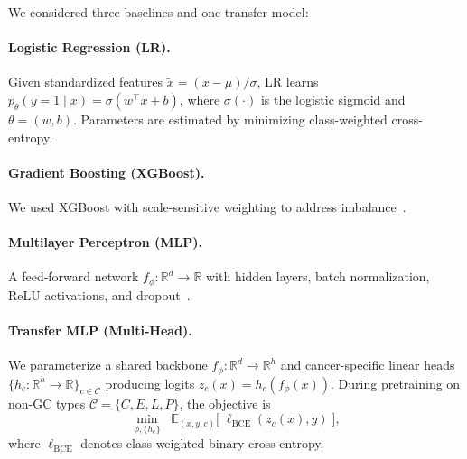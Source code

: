 \documentclass[journal,article,submit,pdftex,moreauthors]{Definitions/mdpi}
\begin{document}
We considered three baselines and one transfer model:

\paragraph{Logistic Regression (LR).} Given standardized features $\tilde{x}=(x-\mu)/\sigma$, LR learns $p_\theta(y{=}1\mid x)=\sigma(w^\top \tilde{x}+b)$, where $\sigma(\cdot)$ is the logistic sigmoid and $\theta{=}(w,b)$. Parameters are estimated by minimizing class-weighted cross-entropy.

\paragraph{Gradient Boosting (XGBoost).} We used XGBoost with scale-sensitive weighting to address imbalance~\citep{Chen2016_XGBoost}.

\paragraph{Multilayer Perceptron (MLP).} A feed-forward network $f_\phi:\mathbb{R}^d\to\mathbb{R}$ with hidden layers, batch normalization, ReLU activations, and dropout~\citep{Ioffe2015_BN,Srivastava2014_Dropout}.

\paragraph{Transfer MLP (Multi-Head).} We parameterize a shared backbone $f_\phi:\mathbb{R}^d\!\to\!\mathbb{R}^h$ and cancer-specific linear heads $\{h_c:\mathbb{R}^h\!\to\!\mathbb{R}\}_{c\in\mathcal{C}}$ producing logits $z_c(x)=h_c(f_\phi(x))$. During pretraining on non-GC types $\mathcal{C}{=}\{C,E,L,P\}$, the objective is
\begin{equation}
\label{eq:pretrain}
\min_{\phi,\{h_c\}}\;\; \mathbb{E}_{(x,y,c)}\Big[\; \ell_{\mathrm{BCE}}(z_c(x),y)\;\Big],
\end{equation}
where $\ell_{\mathrm{BCE}}$ denotes class-weighted binary cross-entropy.
\end{document}
